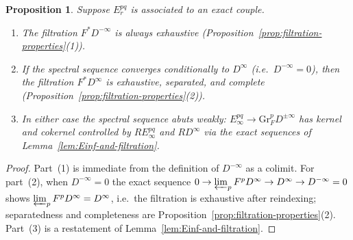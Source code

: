 \documentclass[12pt,a4paper]{article}
\newtheorem{proposition}[theorem]{Proposition}
\theoremstyle{definition}
\newcommand{\Gr}{\mathrm{Gr}}
\begin{document}
\begin{proposition}\label{prop:weak-convergence}
Suppose $E_r^{pq}$ is associated to an exact couple.
\begin{enumerate}
  \item The filtration $F^*D^{-\infty}$ is always exhaustive
    (Proposition~\textup{\ref{prop:filtration-properties}(1)}).
  \item If the spectral sequence converges conditionally to $D^\infty$
    (i.e.\ $D^{-\infty}=0$), then the filtration $F^*D^\infty$ is exhaustive,
    separated, and complete
    (Proposition~\textup{\ref{prop:filtration-properties}(2)}).
  \item In either case the spectral sequence abuts weakly:
    $E_\infty^{pq}\to\Gr_F^pD^{\pm\infty}$ has kernel and cokernel controlled
    by $RE_\infty^{pq}$ and $RD^\infty$ via the exact sequences of
    Lemma~\textup{\ref{lem:Einf-and-filtration}}.
\end{enumerate}
\end{proposition}
\begin{proof}
Part~(1) is immediate from the definition of $D^{-\infty}$ as a colimit.  For
part~(2), when $D^{-\infty}=0$ the exact sequence
$0\to\varprojlim_p F^pD^\infty\to D^\infty\to D^{-\infty}=0$ shows
$\varprojlim_p F^pD^\infty=D^\infty$, i.e.\ the filtration is exhaustive after
reindexing; separatedness and completeness are
Proposition~\ref{prop:filtration-properties}(2).  Part~(3) is a restatement of
Lemma~\ref{lem:Einf-and-filtration}.
\end{proof}
\end{document}

